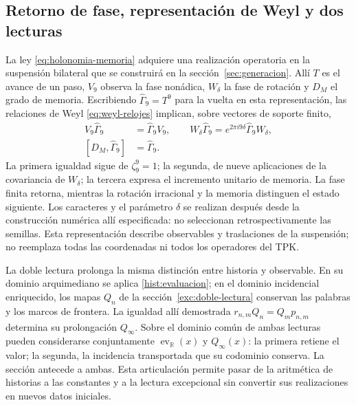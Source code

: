 \subsection{Retorno de fase, representación de Weyl y dos lecturas}
\label{hist:puente-lecturas}

La ley \eqref{eq:holonomia-memoria} adquiere una realización operatoria
en la suspensión bilateral que se construirá en la
sección~\ref{sec:generacion}. Allí \(T\) es el avance de un paso,
\(V_9\) observa la fase nonádica, \(W_\delta\) la fase de rotación y
\(D_M\) el grado de memoria. Escribiendo
\(\widehat\Gamma_9=T^9\) para la vuelta en esta representación,
las relaciones de Weyl \eqref{eq:weyl-relojes} implican, sobre vectores
de soporte finito,
\begin{equation}
 \begin{aligned}
 V_9\widehat\Gamma_9&=\widehat\Gamma_9V_9,\qquad
 W_\delta\widehat\Gamma_9=e^{2\pi i9\delta}
     \widehat\Gamma_9W_\delta,\\
 [D_M,\widehat\Gamma_9]&=\widehat\Gamma_9.
 \end{aligned}
 \label{hist:tres-retornos}
\end{equation}
La primera igualdad sigue de \(\zeta_9^9=1\); la segunda, de nueve
aplicaciones de la covariancia de \(W_\delta\); la tercera expresa
el incremento unitario de memoria. La fase finita retorna, mientras la
rotación irracional y la memoria distinguen el estado siguiente. Los
caracteres y el parámetro \(\delta\) se realizan después desde la
construcción numérica allí especificada: no seleccionan retrospectivamente
las semillas. Esta representación describe observables y traslaciones de
la suspensión; no reemplaza todas las coordenadas ni todos los operadores
del TPK.

La doble lectura prolonga la misma distinción entre historia y observable.
En su dominio arquimediano se aplica \eqref{hist:evaluacion}; en el
dominio incidencial enriquecido, los mapas \(Q_n\) de la
sección~\ref{exc:doble-lectura} conservan las palabras y los marcos de
frontera. La igualdad allí demostrada
\(r_{n,m}Q_n=Q_mp_{n,m}\) determina su prolongación \(Q_\infty\).
Sobre el dominio común de ambas lecturas pueden considerarse conjuntamente
\(\operatorname{ev}_{\mathbb R}(x)\) y \(Q_\infty(x)\): la
primera retiene el valor; la segunda, la incidencia transportada que su
codominio conserva. La sección antecede a ambas. Esta articulación permite
pasar de la aritmética de historias a las constantes y a la lectura
excepcional sin convertir sus realizaciones en nuevos datos iniciales.
